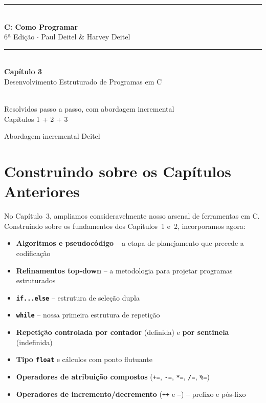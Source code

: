 \documentclass[12pt,a4paper]{article}
\begin{document}
\begin{titlepage}
  \centering\vspace*{2cm}
  {\color{deitelblue}\rule{\linewidth}{2pt}}\\[0.4cm]
  {\huge\bfseries\color{deitelblue}C: Como Programar}\\[0.2cm]
  {\large\color{deitelblue}6ª Edição $\cdot$ Paul Deitel \& Harvey Deitel}\\[0.2cm]
  {\color{deitelblue}\rule{\linewidth}{2pt}}\\[1cm]
  {\LARGE\bfseries Capítulo 3}\\[0.3cm]
  {\Large\color{deitelblue!80}Desenvolvimento Estruturado de Programas em C}\\[0.8cm]
  \begin{tcolorbox}[colback=deitellightblue,colframe=deitelblue,width=0.85\linewidth]
    \\[0.2cm]
    {\normalsize Resolvidos passo a passo, com abordagem incremental\\
    Capítulos 1 + 2 + 3}
  \end{tcolorbox}
  \vfill{\small Abordagem incremental Deitel}
\end{titlepage}

\section*{Construindo sobre os Capítulos Anteriores}

No Capítulo~3, ampliamos consideravelmente nosso arsenal de ferramentas em C.
Construindo sobre os fundamentos dos Capítulos~1 e~2, incorporamos agora:

\begin{itemize}[noitemsep]
  \item \textbf{Algoritmos e pseudocódigo} -- a etapa de planejamento que precede a codificação
  \item \textbf{Refinamentos top-down} -- a metodologia para projetar programas estruturados
  \item \textbf{\texttt{if...else}} -- estrutura de seleção dupla
  \item \textbf{\texttt{while}} -- nossa primeira estrutura de repetição
  \item \textbf{Repetição controlada por contador} (definida) e \textbf{por sentinela} (indefinida)
  \item \textbf{Tipo \texttt{float}} e cálculos com ponto flutuante
  \item \textbf{Operadores de atribuição compostos} (\texttt{+=}, \texttt{-=}, \texttt{*=}, \texttt{/=}, \texttt{\%=})
  \item \textbf{Operadores de incremento/decremento} (\texttt{++} e \texttt{--}) -- prefixo e pós-fixo
\end{itemize}
\end{document}
